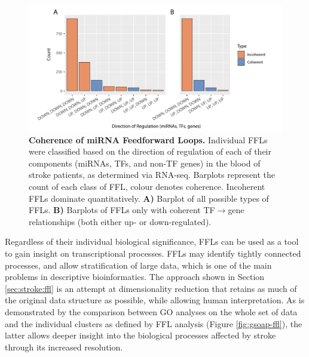 \begin{figure}
\centering
\includegraphics[width=\textwidth]{figures/ffl-coherence}
\caption[Coherence of miRNA Feedforward Loops.]{\textbf{Coherence of miRNA Feedforward Loops.} Individual FFLs were classified based on the direction of regulation of each of their components (miRNAs, TFs, and non-TF genes) in the blood of stroke patients, as determined via RNA-seq. Barplots represent the count of each class of FFL, colour denotes coherence. Incoherent FFLs dominate quantitatively. \textbf{A)} Barplot of all possible types of FFLs. \textbf{B)} Barplots of FFLs only with coherent TF$\to$gene relationships (both either up- or down-regulated). 
\label{fig:ffl-coherence}}
\end{figure}

Regardless of their individual biological significance, FFLs can be used as a tool to gain insight on transcriptional processes. FFLs may identify tightly connected processes, and allow stratification of large data, which is one of the main problems in descriptive bioinformatics. The approach shown in Section \ref{sec:stroke:ffl} is an attempt at dimensionality reduction that retains as much of the original data structure as possible, while allowing human interpretation. As is demonstrated by the comparison between GO analyses on the whole set of data and the individual clusters as defined by FFL analysis (Figure \ref{fig:gsoap-ffl}), the latter allows deeper insight into the biological processes affected by stroke through its increased resolution.

